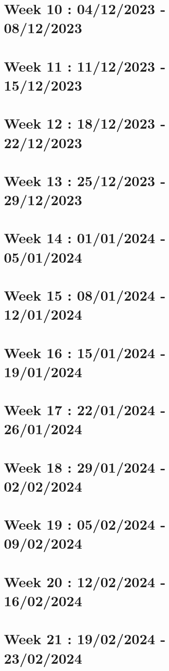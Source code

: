 \documentclass[french]{article}
\begin{document}
	\section{Week 10 : 04/12/2023 - 08/12/2023}
	

	\section{Week 11 : 11/12/2023 - 15/12/2023}
	

	\section{Week 12 : 18/12/2023 - 22/12/2023}
	

	\section{Week 13 : 25/12/2023 - 29/12/2023}
	

	\section{Week 14 : 01/01/2024 - 05/01/2024}
	

	\section{Week 15 : 08/01/2024 - 12/01/2024}
	

	\section{Week 16 : 15/01/2024 - 19/01/2024}
	

	\section{Week 17 : 22/01/2024 - 26/01/2024}
	

	\section{Week 18 : 29/01/2024 - 02/02/2024}
	

	\section{Week 19 : 05/02/2024 - 09/02/2024}
	

	\section{Week 20 : 12/02/2024 - 16/02/2024}
	

	\section{Week 21 : 19/02/2024 - 23/02/2024}
\end{document}
